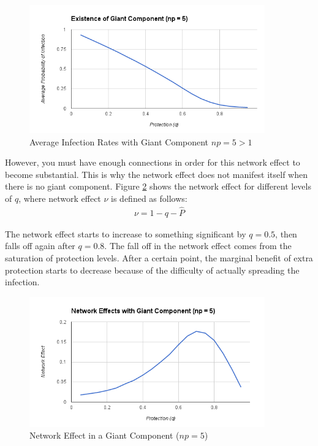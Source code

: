 \documentclass{article}
\theoremstyle{plain}
\begin{document}
\begin{figure}[H]
  \centering
  \includegraphics[width=4in]{avg_prob_np5.png}
  \caption{Average Infection Rates with Giant Component $np = 5 > 1$}
  \label{avg_prob_np5.fig}
\end{figure}

However, you must have enough connections in order for this network effect to become substantial. This is why the network effect does not manifest itself when there is no giant component. Figure \ref{network_effects_np5.fig} shows the network effect for different levels of $q$, where network effect $\nu$ is defined as follows:
\begin{eqnarray}
 \nu = 1 - q - \hat{P}
\end{eqnarray}

The network effect starts to increase to something significant by $q = 0.5$, then falls off again after $q = 0.8$. The fall off in the network effect comes from the saturation of protection levels. After a certain point, the marginal benefit of extra protection starts to decrease because of the difficulty of actually spreading the infection.

\begin{figure}[H]
  \centering
  \includegraphics[width=4in]{network_effects_np5.png}
  \caption{Network Effect in a Giant Component ($np = 5$)}
  \label{network_effects_np5.fig}
\end{figure}
\end{document}
